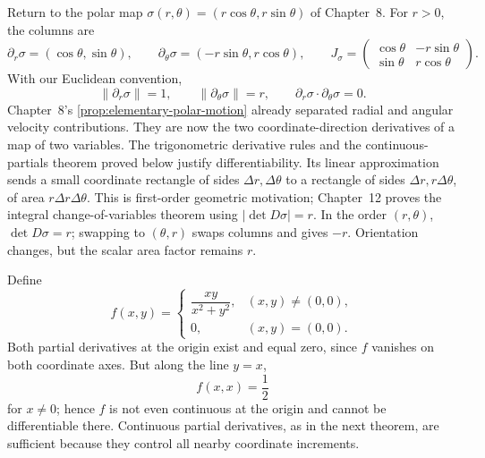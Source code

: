 \begin{example}\label{ex:polar-jacobian}
Return to the polar map $\sigma(r,\theta)=(r\cos\theta,r\sin\theta)$
of Chapter~8. For $r>0$, the columns are
\[
\partial_r\sigma=(\cos\theta,\sin\theta),\qquad
\partial_\theta\sigma=(-r\sin\theta,r\cos\theta),\qquad
J_\sigma=\begin{pmatrix}\cos\theta&-r\sin\theta\\
\sin\theta&r\cos\theta\end{pmatrix}.
\]
With our Euclidean convention,
\[
\|\partial_r\sigma\|=1,\qquad\|\partial_\theta\sigma\|=r,\qquad
\partial_r\sigma\cdot\partial_\theta\sigma=0.
\]
Chapter~8's \cref{prop:elementary-polar-motion} already separated radial
and angular velocity contributions. They are now the two coordinate-direction
derivatives of a map of two variables.
The trigonometric derivative rules and the continuous-partials theorem
proved below justify differentiability. Its linear approximation sends
a small coordinate rectangle of sides $\Delta r,\Delta\theta$ to a
rectangle of sides $\Delta r,r\Delta\theta$, of area
$r\Delta r\Delta\theta$. This is first-order geometric motivation;
Chapter~12 proves the integral change-of-variables theorem using
$|\det D\sigma|=r$. In the order $(r,\theta)$, $\det D\sigma=r$;
swapping to $(\theta,r)$ swaps columns and gives $-r$. Orientation changes,
but the scalar area factor remains $r$.
\end{example}

\begin{center}\end{center}

\begin{example}
\label{ex:partials-not-differentiable}
Define
\[
f(x,y)=
\begin{cases}
\dfrac{xy}{x^2+y^2},&(x,y)\ne(0,0),\\
0,&(x,y)=(0,0).
\end{cases}
\]
Both partial derivatives at the origin exist and equal zero, since \(f\)
vanishes on both coordinate axes.  But along the line \(y=x\),
\[
f(x,x)=\frac12
\]
for \(x\ne0\); hence \(f\) is not even continuous at the origin and cannot
be differentiable there.  Continuous partial derivatives, as in the next
theorem, are sufficient because they control all nearby coordinate increments.
\end{example}

